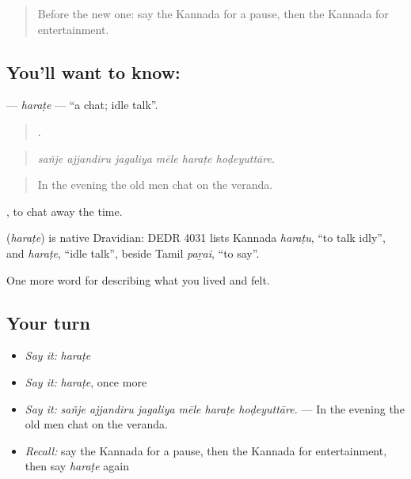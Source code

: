 \label{lesson:KA-C530-harate}



\begin{quote}
Before the new one: say the Kannada for a pause, then the Kannada for entertainment.
\end{quote}

\subsection*{You'll want to know: }
\textbf{} — \emph{haraṭe} — \textquotedblleft{}a chat; idle talk\textquotedblright{}.

\begin{quote}
     .
\end{quote}

\begin{quote}
\emph{sañje ajjandiru jagaliya mēle haraṭe hoḍeyuttāre.}
\end{quote}

\begin{quote}
In the evening the old men chat on the veranda.
\end{quote}

 , to chat away the time.

\begin{cousinweb}
\textbf{} (\emph{haraṭe}) is native Dravidian: DEDR 4031 lists Kannada \emph{haraṭu}, \textquotedblleft{}to talk idly\textquotedblright{}, and \emph{haraṭe}, \textquotedblleft{}idle talk\textquotedblright{}, beside Tamil \emph{paṟai}, \textquotedblleft{}to say\textquotedblright{}.
\end{cousinweb}

\begin{grammarlens}[title={What you've built}]
One more word for describing what you lived and felt.
\end{grammarlens}

\subsection*{Your turn}
\begin{itemize}
\raggedright
  \item \emph{Say it:} \emph{haraṭe}
  \item \emph{Say it:} \emph{haraṭe}, once more
  \item \emph{Say it:} \emph{sañje ajjandiru jagaliya mēle haraṭe hoḍeyuttāre.} — In the evening the old men chat on the veranda.
  \item \emph{Recall:} say the Kannada for a pause, then the Kannada for entertainment, then say \emph{haraṭe} again
\end{itemize}

